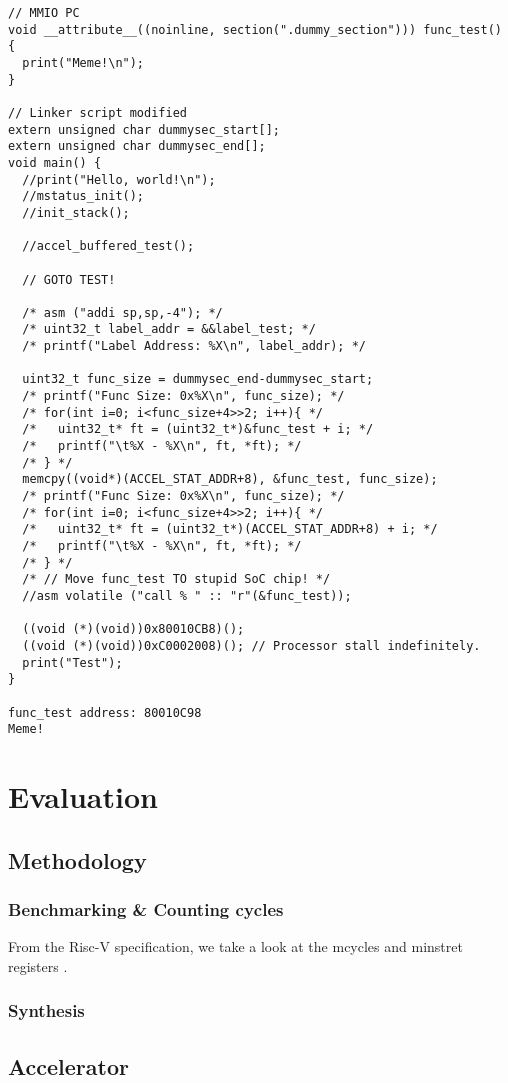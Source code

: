 \documentclass[a4paper,9pt]{report}
\begin{document}
\begin{verbatim}
// MMIO PC
void __attribute__((noinline, section(".dummy_section"))) func_test() {
  print("Meme!\n");
}

// Linker script modified
extern unsigned char dummysec_start[];
extern unsigned char dummysec_end[];
void main() {
  //print("Hello, world!\n");
  //mstatus_init();
  //init_stack();

  //accel_buffered_test();

  // GOTO TEST!

  /* asm ("addi sp,sp,-4"); */
  /* uint32_t label_addr = &&label_test; */
  /* printf("Label Address: %X\n", label_addr); */

  uint32_t func_size = dummysec_end-dummysec_start;
  /* printf("Func Size: 0x%X\n", func_size); */
  /* for(int i=0; i<func_size+4>>2; i++){ */
  /*   uint32_t* ft = (uint32_t*)&func_test + i; */
  /*   printf("\t%X - %X\n", ft, *ft); */
  /* } */
  memcpy((void*)(ACCEL_STAT_ADDR+8), &func_test, func_size);
  /* printf("Func Size: 0x%X\n", func_size); */
  /* for(int i=0; i<func_size+4>>2; i++){ */
  /*   uint32_t* ft = (uint32_t*)(ACCEL_STAT_ADDR+8) + i; */
  /*   printf("\t%X - %X\n", ft, *ft); */
  /* } */
  /* // Move func_test TO stupid SoC chip! */
  //asm volatile ("call % " :: "r"(&func_test));

  ((void (*)(void))0x80010CB8)();
  ((void (*)(void))0xC0002008)(); // Processor stall indefinitely.
  print("Test");
}

func_test address: 80010C98
Meme!
\end{verbatim}




\chapter{Evaluation} 
\section{Methodology}
\subsection{Benchmarking \& Counting cycles}
From the Risc-V specification, we take a look at the mcycles and minstret
registers
.
\subsection{Synthesis}

\section{Accelerator}
\end{document}
